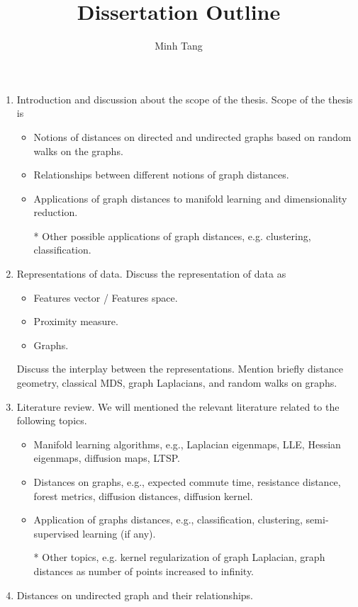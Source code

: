\documentclass{article}
\begin{document}
\title{Dissertation Outline}
\author{Minh Tang}
\maketitle
\begin{enumerate}
\item Introduction and discussion about the scope of the
  thesis. Scope of the thesis is
  \begin{itemize}
  \item Notions of distances on directed and undirected graphs
    based on random walks on the graphs.
  \item Relationships between different notions of graph distances.
  \item Applications of graph distances to manifold learning and
    dimensionality reduction.
  \item[*] Other possible applications of graph distances,
    e.g. clustering, classification.
  \end{itemize}
\item Representations of data. Discuss the representation of data as
  \begin{itemize}
  \item Features vector / Features space.
  \item Proximity measure.
  \item Graphs.
  \end{itemize}
  Discuss the interplay between the representations. Mention briefly
  distance geometry, classical MDS, graph Laplacians, and random walks
  on graphs.
\item Literature review. We will mentioned the relevant literature
  related to the following topics.
  \begin{itemize}
  \item Manifold learning algorithms, e.g., Laplacian eigenmaps, LLE,
    Hessian eigenmaps, diffusion maps, LTSP.
  \item Distances on graphs, e.g., expected commute time, resistance
    distance, forest metrics, diffusion distances, diffusion kernel.
  \item Application of graphs distances, e.g., classification,
    clustering, semi-supervised learning (if any).
  \item[*] Other topics, e.g. kernel regularization of graph
    Laplacian, graph distances as number of points increased to infinity.
  \end{itemize}
\item Distances on undirected graph and their relationships.

\end{enumerate}
\end{document}
